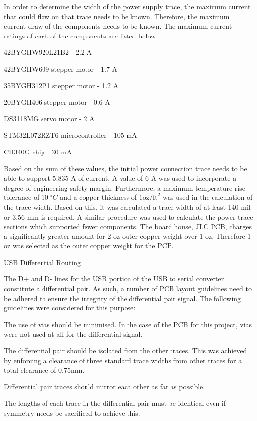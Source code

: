 In order to determine the width of the power supply trace, the maximum current that could flow on that trace needs to be known. Therefore, the maximum current draw of the components needs to be known. The maximum current ratings of each of the components are listed below.

\begin{compactitem}
	\item 42BYGHW920L21B2 - 2.2 A
	\item 42BYGHW609 stepper motor - 1.7 A
	\item 35BYGH312P1 stepper motor - 1.2 A
	\item 20BYGH406 stepper motor - 0.6 A
	\item DS3118MG servo motor - 2 A
	\item STM32L072RZT6 microcontroller - 105 mA
	\item CH340G chip - 30 mA
\end{compactitem}

Based on the sum of these values, the initial power connection trace needs to be able to support 5.835 A of current. A value of 6 A was used to incorporate a degree of engineering safety margin. Furthermore, a maximum temperature rise tolerance of $10\;^{\circ}C$ and a copper thickness of $1 \text{oz/ft}^2$ was used in the calculation of the trace width. Based on this, it was calculated a trace width of at least 140 mil or 3.56 mm is required. A similar procedure was used to calculate the power trace sections which supported fewer components. The board house, JLC PCB, charges a significantly greater amount for 2 oz outer copper weight over 1 oz. Therefore 1 oz was selected as the outer copper weight for the PCB. 

USB Differential Routing

The D+ and D- lines for the USB portion of the USB to serial converter constitute a differential pair. As such, a number of PCB layout guidelines need to be adhered to ensure the integrity of the differential pair signal. The following guidelines were considered for this purpose:

\begin{compactitem}
	\item The use of vias should be minimised. In the case of the PCB for this project, vias were not used at all for the differential signal.
	\item The differential pair should be isolated from the other traces. This was achieved by enforcing a clearance of three standard trace widths from other traces for a total clearance of 0.75mm.
	\item Differential pair traces should mirror each other as far as possible.
	\item The lengths of each trace in the differential pair must be identical even if symmetry needs be sacrificed to achieve this.
\end{compactitem}


